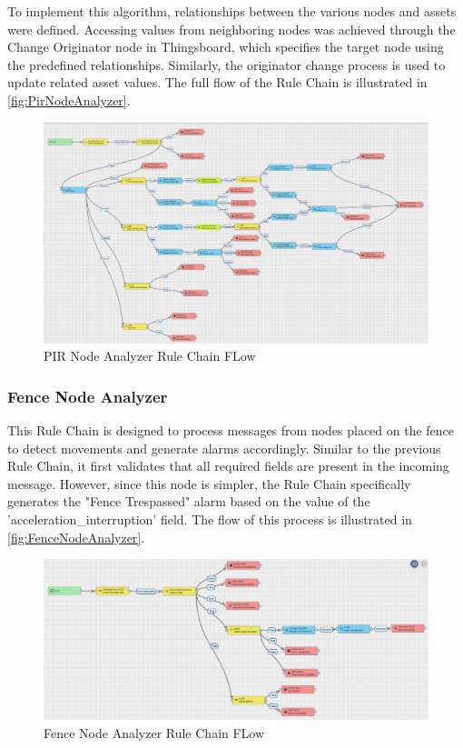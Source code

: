 To implement this algorithm, relationships between the various nodes and assets were defined. Accessing values from neighboring nodes was achieved through the Change
Originator node in Thingsboard, which specifies the target node using the predefined relationships. Similarly, the originator change process is used to update related 
asset values. The full flow of the Rule Chain is illustrated in \autoref{fig:PirNodeAnalyzer}.

\begin{figure}[H]
    \centering
    \includegraphics[width=1.4\textwidth,angle=90]{./images/8/PirNodeAnalyzer.PNG}
    \caption{PIR Node Analyzer Rule Chain FLow}
    \label{fig:PirNodeAnalyzer}
\end{figure}

\subsubsection*{Fence Node Analyzer}
This Rule Chain is designed to process messages from nodes placed on the fence to detect movements and generate alarms accordingly.  
Similar to the previous Rule Chain, it first validates that all required fields are present in the incoming message. However, since this node is simpler, the Rule 
Chain specifically generates the "Fence Trespassed" alarm based on the value of the 'acceleration\_interruption' field. The flow of this process is illustrated in \autoref{fig:FenceNodeAnalyzer}.

\begin{figure}[H]
    \centering
    \includegraphics[width=1\textwidth]{./images/8/FenceNodeAnalyzer.PNG}
    \caption{Fence Node Analyzer Rule Chain FLow}
    \label{fig:FenceNodeAnalyzer}
\end{figure}

